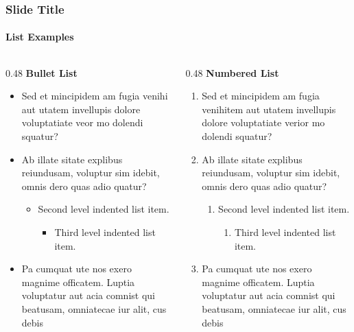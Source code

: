 \documentclass[
	aspectratio=169, %
	t, %
	onlytextwidth, %
	10pt, %
]{beamer}
\begin{document}
\begin{frame}
	\frametitle{Slide Title}
	\framesubtitle{List Examples}
	
	\begin{columns}[T] %
		\begin{column}{0.48\linewidth} %
			\textbf{Bullet List}\\
			\begin{itemize}
				\item Sed et mincipidem am fugia venihi aut utatem invellupis dolore voluptatiate veor mo dolendi squatur?
				\item Ab illate sitate explibus reiundusam, voluptur sim idebit, omnis dero quas adio quatur?
				\begin{itemize}
					\item Second level indented list item.
					\begin{itemize}
						\item Third level indented list item.
					\end{itemize}
				\end{itemize}
				\item Pa cumquat ute nos exero magnime officatem. Luptia voluptatur aut acia comnist qui beatusam, omniatecae iur alit, cus debis
			\end{itemize}
		\end{column}
		\begin{column}{0.48\linewidth} %
			\textbf{Numbered List}\\
			\begin{enumerate}
				\item Sed et mincipidem am fugia venihitem aut utatem invellupis dolore voluptatiate verior mo dolendi squatur?		
				\item Ab illate sitate explibus reiundusam, voluptur sim idebit, omnis dero quas adio quatur?
				\begin{enumerate}
					\item Second level indented list item.
					\begin{enumerate}
						\item Third level indented list item.
					\end{enumerate}
				\end{enumerate}
				\item Pa cumquat ute nos exero magnime officatem. Luptia voluptatur aut acia comnist qui beatusam, omniatecae iur alit, cus debis
			\end{enumerate}
		\end{column}
	\end{columns}
\end{frame}
\end{document}
